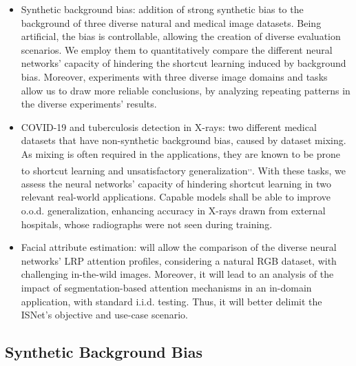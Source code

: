 \documentclass[fleqn,10pt]{wlscirep}
\begin{document}
\begin{itemize}
    \item Synthetic background bias: addition of strong synthetic bias to the background of three diverse natural and medical image datasets. Being artificial, the bias is controllable, allowing the creation of diverse evaluation scenarios. We employ them to quantitatively compare the different neural networks' capacity of hindering the shortcut learning induced by background bias. Moreover, experiments with three diverse image domains and tasks allow us to draw more reliable conclusions, by analyzing repeating patterns in the diverse experiments' results.
    \item COVID-19 and tuberculosis detection in X-rays: two different medical datasets that have non-synthetic background bias, caused by dataset mixing. As mixing is often required in the applications, they are known to be prone to shortcut learning and unsatisfactory generalization\cite{ShortcutCovid}\textsuperscript{,}\cite{NatureCovidBias}\textsuperscript{,}\cite{who}. With these tasks, we assess the neural networks' capacity of hindering shortcut learning in two relevant real-world applications. Capable models shall be able to improve o.o.d. generalization, enhancing accuracy in X-rays drawn from external hospitals, whose radiographs were not seen during training.
    \item Facial attribute estimation: will allow the comparison of the diverse neural networks' LRP attention profiles, considering a natural RGB dataset, with challenging in-the-wild images. Moreover, it will lead to an analysis of the impact of segmentation-based attention mechanisms in an in-domain application, with standard i.i.d. testing. Thus, it will better delimit the ISNet's objective and use-case scenario.
\end{itemize}



\subsection{Synthetic Background Bias}
\label{resultsSynth}
\end{document}
